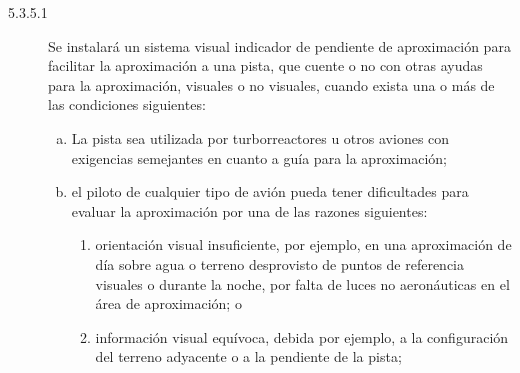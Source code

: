 \begin{tcolorbox}[title=Requerimientos OACI. Anexo 14. Volumen I. Edición 2018.\\
  5.3.5 Sistemas visuales indicadores de pendiente de aproximación
  ]

  {\footnotesize

    \begin{description}
    \item [5.3.5.1] Se instalará un sistema visual indicador de pendiente de aproximación para facilitar la aproximación a una pista, que cuente o no con otras ayudas para la aproximación, visuales o no visuales, cuando exista una o más de las condiciones
siguientes:
\begin{enumerate}[a)]
\item La pista sea utilizada por turborreactores u otros aviones
  con exigencias semejantes en cuanto a guía para la aproximación; 
\item el piloto de cualquier tipo de avión pueda tener dificultades para
  evaluar la aproximación por una de las razones siguientes:

  \begin{enumerate}[1)]
  \item orientación visual insuficiente, por ejemplo, en una
    aproximación de día sobre agua o terreno desprovisto de puntos de
    referencia visuales o durante la noche, por falta de luces no
    aeronáuticas en el área de aproximación; o 
  \item información visual
    equívoca, debida por ejemplo, a la configuración del terreno
    adyacente o a la pendiente de la pista;
  \end{enumerate}

\end{enumerate}
\end{description}
}
\end{tcolorbox}

